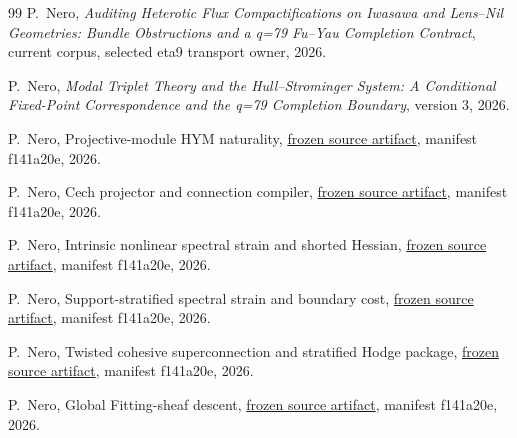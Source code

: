 \documentclass[11pt]{article}
\begin{document}
\begin{thebibliography}{99}
P.~Nero,
\newblock \emph{Auditing Heterotic Flux Compactifications on Iwasawa and
Lens--Nil Geometries: Bundle Obstructions and a q=79 Fu--Yau Completion
Contract},
\newblock current corpus, selected eta9 transport owner, 2026.

P.~Nero,
\newblock \emph{Modal Triplet Theory and the Hull--Strominger System:
A Conditional Fixed-Point Correspondence and the q=79 Completion Boundary},
\newblock version 3, 2026.

P.~Nero,
\newblock Projective-module HYM naturality,
\newblock \href{https://github.com/PeterNero/mtt-results-repro/blob/f141a20ea23c5c3ff19cc2161c0e226e29ade8a7/release/results/q79_projective_hym_naturality/artifact.json}{frozen source artifact}, manifest f141a20e, 2026.

P.~Nero,
\newblock Cech projector and connection compiler,
\newblock \href{https://github.com/PeterNero/mtt-results-repro/blob/f141a20ea23c5c3ff19cc2161c0e226e29ade8a7/release/results/q79_cech_projector_compiler/artifact.json}{frozen source artifact}, manifest f141a20e, 2026.

P.~Nero,
\newblock Intrinsic nonlinear spectral strain and shorted Hessian,
\newblock \href{https://github.com/PeterNero/mtt-results-repro/blob/f141a20ea23c5c3ff19cc2161c0e226e29ade8a7/release/results/q79_spectral_strain_hessian/artifact.json}{frozen source artifact}, manifest f141a20e, 2026.

P.~Nero,
\newblock Support-stratified spectral strain and boundary cost,
\newblock \href{https://github.com/PeterNero/mtt-results-repro/blob/f141a20ea23c5c3ff19cc2161c0e226e29ade8a7/release/results/q79_support_stratified_strain/artifact.json}{frozen source artifact}, manifest f141a20e, 2026.

P.~Nero,
\newblock Twisted cohesive superconnection and stratified Hodge package,
\newblock \href{https://github.com/PeterNero/mtt-results-repro/blob/f141a20ea23c5c3ff19cc2161c0e226e29ade8a7/release/results/q79_cohesive_superconnection/artifact.json}{frozen source artifact}, manifest f141a20e, 2026.

P.~Nero,
\newblock Global Fitting-sheaf descent,
\newblock \href{https://github.com/PeterNero/mtt-results-repro/blob/f141a20ea23c5c3ff19cc2161c0e226e29ade8a7/release/results/q79_global_fitting_descent/artifact.json}{frozen source artifact}, manifest f141a20e, 2026.


\end{thebibliography}
\end{document}
